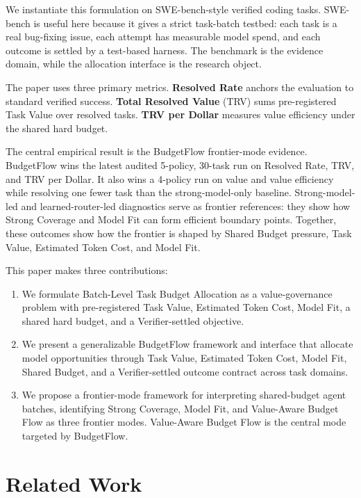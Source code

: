 \documentclass{article}
\newcommand{\method}{BudgetFlow\xspace}
\newcommand{\trv}{TRV\xspace}
\newcommand{\taskvalue}{Task Value\xspace}
\newcommand{\tokencost}{Estimated Token Cost\xspace}
\newcommand{\modelfit}{Model Fit\xspace}
\newcommand{\sharedbudget}{Shared Budget\xspace}
\newcommand{\verifier}{Verifier\xspace}
\begin{document}
We instantiate this formulation on SWE-bench-style verified coding tasks. SWE-bench is useful here because it gives a strict task-batch testbed: each task is a real bug-fixing issue, each attempt has measurable model spend, and each outcome is settled by a test-based harness. The benchmark is the evidence domain, while the allocation interface is the research object.

The paper uses three primary metrics. \textbf{Resolved Rate} anchors the evaluation to standard verified success. \textbf{Total Resolved Value} (\trv) sums pre-registered \taskvalue over resolved tasks. \textbf{\trv per Dollar} measures value efficiency under the shared hard budget.

The central empirical result is the \method frontier-mode evidence. \method wins the latest audited 5-policy, 30-task run on Resolved Rate, \trv, and \trv per Dollar. It also wins a 4-policy run on value and value efficiency while resolving one fewer task than the strong-model-only baseline. Strong-model-led and learned-router-led diagnostics serve as frontier references: they show how Strong Coverage and Model Fit can form efficient boundary points. Together, these outcomes show how the frontier is shaped by \sharedbudget pressure, \taskvalue, \tokencost, and \modelfit.

This paper makes three contributions:

\begin{enumerate}
    \item We formulate Batch-Level Task Budget Allocation as a value-governance problem with pre-registered \taskvalue, \tokencost, \modelfit, a shared hard budget, and a \verifier-settled objective.
    \item We present a generalizable \method framework and interface that allocate model opportunities through \taskvalue, \tokencost, \modelfit, \sharedbudget, and a \verifier-settled outcome contract across task domains.
    \item We propose a frontier-mode framework for interpreting shared-budget agent batches, identifying Strong Coverage, Model Fit, and Value-Aware Budget Flow as three frontier modes. Value-Aware Budget Flow is the central mode targeted by \method.
\end{enumerate}

\section{Related Work}
\label{sec:related}
\end{document}
